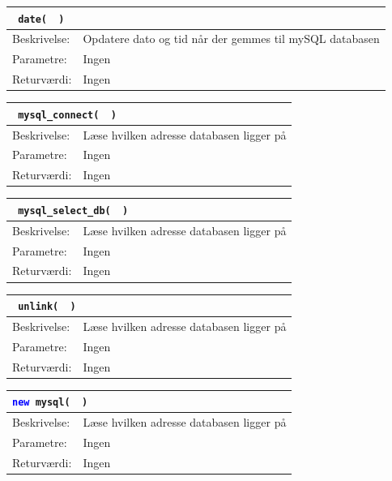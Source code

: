 \begin{table}[H]
\begin{tabular}{l p{12.5cm}}
\multicolumn{2}{l}{\texttt{\textcolor{blue}{} date( \textcolor{blue}{} )}} \\
\hline
Beskrivelse: &Opdatere dato og tid når der gemmes til mySQL databasen\\
Parametre: & Ingen\\
Returværdi: & Ingen\\
\end{tabular}
\end{table}

\begin{table}[H]
\begin{tabular}{l p{12.5cm}}
\multicolumn{2}{l}{\texttt{\textcolor{blue}{} mysql\_connect( \textcolor{blue}{} )}} \\
\hline
Beskrivelse: &Læse hvilken adresse databasen ligger på\\
Parametre: & Ingen\\
Returværdi: & Ingen\\
\end{tabular}
\end{table}

\begin{table}[H]
\begin{tabular}{l p{12.5cm}}
\multicolumn{2}{l}{\texttt{\textcolor{blue}{} mysql\_select\_db( \textcolor{blue}{} )}} \\
\hline
Beskrivelse: & Læse hvilken adresse databasen ligger på\\
Parametre: & Ingen\\
Returværdi: & Ingen\\
\end{tabular}
\end{table}

\begin{table}[H]
\begin{tabular}{l p{12.5cm}}
\multicolumn{2}{l}{\texttt{\textcolor{blue}{} unlink( \textcolor{blue}{} )}} \\
\hline
Beskrivelse: & Læse hvilken adresse databasen ligger på\\
Parametre: & Ingen\\
Returværdi: & Ingen\\
\end{tabular}
\end{table}

\begin{table}[H]
\begin{tabular}{l p{12.5cm}}
\multicolumn{2}{l}{\texttt{\textcolor{blue}{new} mysql( \textcolor{blue}{} )}} \\
\hline
Beskrivelse: & Læse hvilken adresse databasen ligger på\\
Parametre: & Ingen\\
Returværdi: & Ingen\\
\end{tabular}
\end{table}

